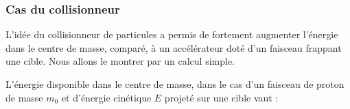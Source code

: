 %   
%   
%   
%   
% 
  
  \subsubsection{Cas du collisionneur}
  
  L'id\'ee du collisionneur de particules a permis de fortement augmenter l'\'energie dans le centre de masse, compar\'e, \`a un acc\'el\'erateur dot\'e d'un faisceau frappant une cible. Nous allons le montrer par un calcul simple.
  
  \medskip
  
  L'\'energie disponible dans le centre de masse, dans le cas d'un faisceau de proton de masse $m_0$ et d'\'energie cin\'etique $E$ projet\'e sur une cible vaut : 
 
